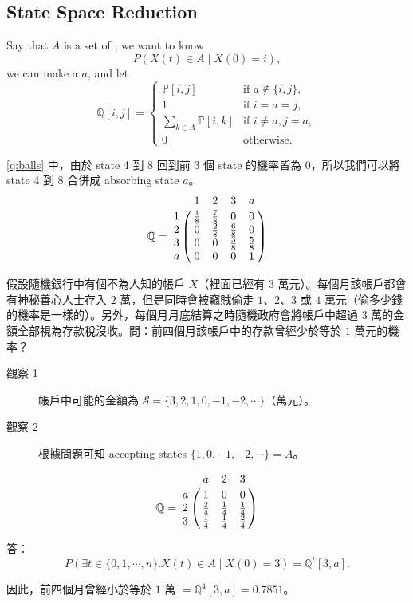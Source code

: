 \subsection{State Space Reduction}

Say that $ A $ is a set of , we want to know
\[ P(X(t) \in A \mid X(0) = i), \]
we can make a  $ a $, and let
\[ \mathbb{Q}[i, j] = \begin{cases}
  \mathbb{P}[i, j]                & \text{if } a \not\in \{i, j\}, \\
  1                               & \text{if } i = a = j, \\
  \sum_{k \in A} \mathbb{P}[i, k] & \text{if } i \neq a, j = a, \\
  0                               & \text{otherwise.}
\end{cases} \]

\begin{comment}
An accepting states, $ A $, is built according to the question. 
\end{comment}

\begin{example}
\autoref{q:balls} 中，由於 state 4 到 8 回到前 3 個 state 的機率皆為 0，所以我們可以將 state 4 到 8 合併成 absorbing state $ a $。
\[ \mathbb{Q} = \bordermatrix{
    & 1 & 2 & 3 & a \cr
  1 & \frac{1}{8} & \frac{7}{8} & 0 & 0 \cr
  2 & 0 & \frac{2}{8} & \frac{6}{8} & 0 \cr
  3 & 0 & 0 & \frac{3}{8} & \frac{5}{8} \cr
  a & 0 & 0 & 0 & 1 \cr
} \]
\end{example}

\begin{example}
假設隨機銀行中有個不為人知的帳戶 $ X $（裡面已經有 $ 3 $ 萬元）。每個月該帳戶都會有神秘善心人士存入 $ 2 $ 萬，但是同時會被竊賊偷走 $ 1 $、$ 2 $、$ 3 $ 或 $ 4 $ 萬元（偷多少錢的機率是一樣的）。另外，每個月月底結算之時隨機政府會將帳戶中超過 $ 3 $ 萬的金額全部視為存款稅沒收。問：前四個月該帳戶中的存款曾經少於等於 $ 1 $ 萬元的機率？
\begin{description}
  \item[觀察 1] 帳戶中可能的金額為 $ \mathcal{S} = \{3, 2, 1, 0, -1, -2, \cdots \} $（萬元）。
  \item[觀察 2] 根據問題可知 accepting states $ \{1, 0, -1, -2, \cdots\} = A $。
\end{description}

\[ \mathbb{Q} = \bordermatrix{
    & a   & 2   & 3   \cr
  a & 1   & 0   & 0   \cr
  2 & \frac{2}{4}  & \frac{1}{4} & \frac{1}{4} \cr
  3 & \frac{1}{4} & \frac{1}{4} & \frac{2}{4}
} \]

答：
\[ P(\exists t \in \{0, 1, \cdots, n \} . X(t)\in A \mid X(0) = 3) = \mathbb{Q}^{t}[3, a]. \]

因此，前四個月曾經小於等於 $ 1 $ 萬 $ = \mathbb{Q}^{4}[3, a] = 0.7851 $。

\end{example}